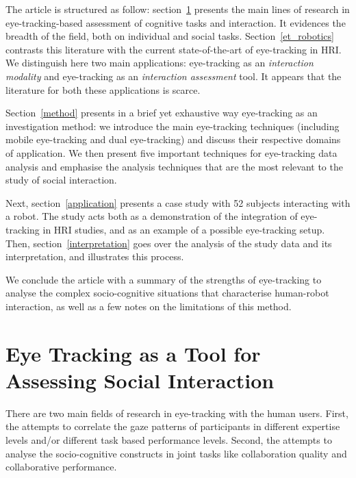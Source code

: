 \documentclass{sig-alternate}
\begin{document}
The article is structured as follow: section~\ref{et_assessing} presents the
main lines of research in eye-tracking-based assessment of cognitive
tasks and interaction. It evidences the breadth of the field, both on individual
and social tasks. Section~\ref{et_robotics} contrasts this literature with the
current state-of-the-art of eye-tracking in HRI. We distinguish here two main
applications: eye-tracking as an \emph{interaction modality} and eye-tracking as
an \emph{interaction assessment} tool. It appears that the literature for both
these applications is scarce.

Section~\ref{method} presents in a brief yet exhaustive way eye-tracking as an
investigation method: we introduce the main eye-tracking techniques (including
mobile eye-tracking and dual eye-tracking) and discuss their respective domains
of application. We then present five important techniques for eye-tracking data
analysis and emphasise the analysis techniques that are the most relevant to the
study of social interaction.

Next, section~\ref{application} presents a case study with 52 subjects
interacting with a robot. The study acts both as a demonstration of the
integration of eye-tracking in HRI studies, and as an example of a possible
eye-tracking setup. Then, section~\ref{interpretation} goes over the analysis of
the study data and its interpretation, and illustrates this process.

We conclude the article with a summary of the strengths of eye-tracking to
analyse the complex socio-cognitive situations that characterise human-robot
interaction, as well as a few notes on the limitations of this method.


\section{Eye Tracking as a Tool for Assessing Social Interaction}
\label{et_assessing}

There are two main fields of research in eye-tracking with the human users.  First, the attempts to correlate the gaze patterns of participants in different expertise levels and/or different task based performance levels. Second, the  attempts to analyse  the socio-cognitive constructs in joint tasks like collaboration quality and collaborative performance.
\end{document}
